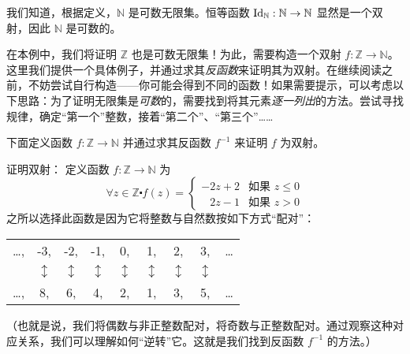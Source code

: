 \begin{example}\label{ex:example7.6.12}

    我们知道，根据定义，$\mathbb{N}$ 是可数无限集。恒等函数 $\text{Id}_{\mathbb{N}} : \mathbb{N} \to \mathbb{N}$ 显然是一个双射，因此 $\mathbb{N}$ 是可数的。

    在本例中，我们将证明 $\mathbb{Z}$ 也是可数无限集！为此，需要构造一个双射 $f : \mathbb{Z} \to \mathbb{N}$。这里我们提供一个具体例子，并通过求其\emph{反函数}来证明其为双射。在继续阅读之前，不妨尝试自行构造——你可能会得到不同的函数！如果需要提示，可以考虑以下思路：为了证明无限集是\emph{可数}的，需要找到将其元素\emph{逐一列出}的方法。尝试寻找规律，确定``第一个''整数，接着``第二个''、``第三个''……

    下面定义函数 $f : \mathbb{Z} \to \mathbb{N}$ 并通过求其反函数 $f^{-1}$ 来证明 $f$ 为双射。

    \begin{proofs}{证明双射：}
        定义函数 $f : \mathbb{Z} \to \mathbb{N}$ 为
        \[\forall z \in \mathbb{Z} \centerdot f(z) = \begin{cases}
                -2z + 2          & \text{如果\ } z \le 0 \\
                \enspace\; 2z -1 & \text{如果\ } z > 0
            \end{cases}\]
        之所以选择此函数是因为它将整数与自然数按如下方式``配对''：
        \begin{center}
            \begin{tabular}{ccccccccc}
                \dots , & -3,            & -2,            & -1,            & 0,             & 1,             & 2,             & 3,             & \dots \\
                        & $\updownarrow$ & $\updownarrow$ & $\updownarrow$ & $\updownarrow$ & $\updownarrow$ & $\updownarrow$ & $\updownarrow$ &       \\
                \dots , & 8,             & 6,             & 4,             & 2,             & 1,             & 3,             & 5,             & \dots
            \end{tabular}
        \end{center}
        （也就是说，我们将偶数与非正整数配对，将奇数与正整数配对。通过观察这种对应关系，我们可以理解如何``逆转''它。这就是我们找到反函数 $f^{-1}$ 的方法。）


\end{proofs}
\end{example}
